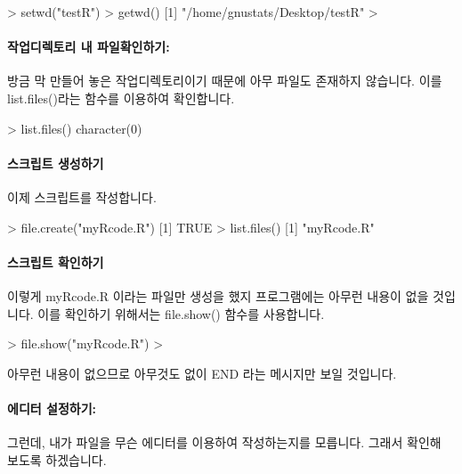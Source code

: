 \begin{Schunk}
\begin{Soutput}
> setwd("testR")
> getwd()
[1] "/home/gnustats/Desktop/testR"
>
\end{Soutput}
\end{Schunk}

\paragraph{작업디렉토리 내 파일확인하기:}
방금 막 만들어 놓은 작업디렉토리이기 때문에 아무 파일도 존재하지 않습니다. 
이를 list.files()라는 함수를 이용하여 확인합니다. 

\begin{Schunk}
\begin{Soutput}
> list.files()
character(0)
\end{Soutput}
\end{Schunk}

\paragraph{스크립트 생성하기}
이제 스크립트를 작성합니다. 
\begin{Schunk}
\begin{Soutput}
> file.create("myRcode.R")
[1] TRUE
> list.files()
[1] "myRcode.R"
\end{Soutput}
\end{Schunk}

\paragraph{스크립트 확인하기}
이렇게 myRcode.R 이라는 파일만 생성을 했지 프로그램에는 아무런 내용이 없을 것입니다. 
이를 확인하기 위해서는 file.show() 함수를 사용합니다. 

\begin{Schunk}
\begin{Soutput}
> file.show("myRcode.R")
>
\end{Soutput}
\end{Schunk}

아무런 내용이 없으므로 아무것도 없이 END 라는 메시지만 보일 것입니다.

\paragraph{에디터 설정하기: }
그런데, 내가 파일을 무슨 에디터를 이용하여 작성하는지를 모릅니다. 
그래서 확인해 보도록 하겠습니다.

